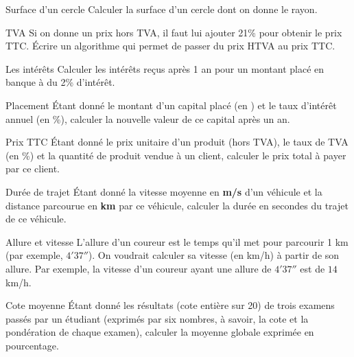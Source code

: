 		\begin{Exercice}{Surface d’un cercle}
			Calculer la surface d’un cercle dont on donne le rayon. 
		\end{Exercice}
	
		\begin{Exercice}{TVA}
			Si on donne un prix hors TVA, il faut lui ajouter 21\% 
			pour obtenir le prix TTC. Écrire un algorithme qui permet 
			de passer du prix HTVA au prix TTC.
		\end{Exercice}
	
		\begin{Exercice}{Les intérêts}
			Calculer les intérêts reçus après 1 an pour un montant placé en 
			banque à du 2\% d’intérêt.
		\end{Exercice}
	
		\begin{Exercice}{Placement}
			Étant donné le montant d’un capital placé (en \texteuro) 
			et le taux d’intérêt annuel (en \%), 
			calculer la nouvelle valeur de ce capital après un an.
		\end{Exercice}
	
		\begin{Exercice}{Prix TTC}
			Étant donné le prix unitaire d’un produit
			(hors TVA), le taux de TVA (en \%) et la quantité de produit vendue à
			un client, calculer le prix total à payer par ce client.
		\end{Exercice}
	
		\begin{Exercice}{Durée de trajet}
			Étant donné la vitesse moyenne en \textbf{m/s}
			d’un véhicule et la distance parcourue en \textbf{km} par ce véhicule,
			calculer la durée en secondes du trajet de ce véhicule.
		\end{Exercice}
	
		\begin{Exercice}{Allure et vitesse}
			L'allure d'un coureur est le temps qu'il met pour parcourir 1 km
			(par exemple, $4'37''$).
			On voudrait calculer sa vitesse (en km/h) à partir de son allure.
			Par exemple, la vitesse d'un coureur ayant une allure de
			$4'37''$ est de $14$ km/h. 
		\end{Exercice}
	
		\begin{Exercice}{Cote moyenne}
			Étant donné les résultats (cote entière sur
			20) de trois examens passés par un étudiant (exprimés par six nombres,
			à savoir, la cote et la pondération de chaque examen), calculer 
			la moyenne globale exprimée en pourcentage.
		\end{Exercice}
	
